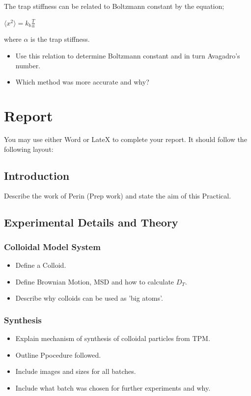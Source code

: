 \documentclass[12pt,a4paper,twoside]{article}
\begin{document}
The trap stiffness can be related to Boltzmann constant by the equation;

$ \langle x^2 \rangle = k_b \frac{T}{\alpha} $

where $\alpha$ is the trap stiffness. 

 \begin{itemize}
\item Use this relation to determine Boltzmann constant and in turn Avagadro's number.
          \vspace{2cm}
\item Which method was more accurate and why?
	\vspace{2cm}
\end{itemize}

\newpage

\section{Report}
You may use either Word or LateX to complete your report. It should follow the following layout:


\subsection{Introduction}
Describe the work of Perin (Prep work) and state the aim of this Practical.

\subsection{Experimental Details and Theory}
\subsubsection{Colloidal Model System}
 \begin{itemize}
	\item Define a Colloid.
	\item Define Brownian Motion, MSD and how to calculate $D_T$.
	\item Describe why colloids can be used as 'big atoms'.	
\end{itemize}

\subsubsection{Synthesis}
 \begin{itemize}
	\item Explain mechanism of synthesis of colloidal particles from TPM.
	\item Outline Ppocedure followed.
	\item Include images and sizes for all batches.
	\item Include what batch was chosen for further experiments and why.	
\end{itemize}
\end{document}
